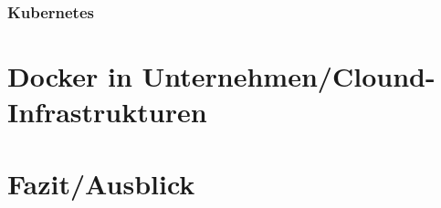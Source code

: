 \documentclass[11pt,a4paper,oneside]{report}
\newcommand{\bibtexFilename}{draft} %
\begin{document}
		\subsection{Kubernetes}
\chapter{Docker in Unternehmen/Clound-Infrastrukturen}


\chapter{Fazit/Ausblick}



\appendix


\end{document}
